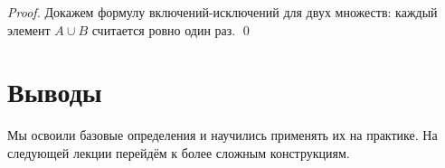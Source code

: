 \documentclass[11pt,a4paper]{article}
\begin{document}
\begin{proof}
Докажем формулу включений-исключений для двух множеств: каждый элемент
$A \cup B$ считается ровно один раз.
\qed
\end{proof}

\section{Выводы}

\begin{keyidea}
Мы освоили базовые определения и научились применять их на практике.
На следующей лекции перейдём к более сложным конструкциям.
\end{keyidea}
\end{document}
